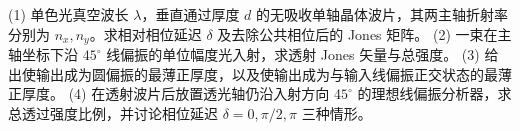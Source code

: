 (1) 单色光真空波长 \(\lambda\)，垂直通过厚度 \(d\) 的无吸收单轴晶体波片，其两主轴折射率分别为 \(n_x,n_y\)。求相对相位延迟 \(\delta\) 及去除公共相位后的 Jones 矩阵。
(2) 一束在主轴坐标下沿 \(45^\circ\) 线偏振的单位幅度光入射，求透射 Jones 矢量与总强度。
(3) 给出使输出成为圆偏振的最薄正厚度，以及使输出成为与输入线偏振正交状态的最薄正厚度。
(4) 在透射波片后放置透光轴仍沿入射方向 \(45^\circ\) 的理想线偏振分析器，求总透过强度比例，并讨论相位延迟 \(\delta=0,\pi/2,\pi\) 三种情形。

